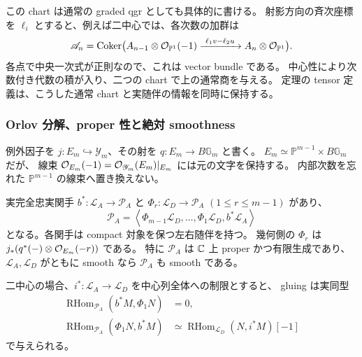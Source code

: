この chart は通常の graded qgr としても具体的に書ける。
射影方向の斉次座標を $\ell_i$ とすると、例えば二中心では、各次数の加群は
\[
 \mathscr A_n
   =\operatorname{Coker}\bigl(
    A_{n-1}\otimes\mathcal O_{\mathbb P^1}(-1)
       \xrightarrow{\ \ell_1v-\ell_2u\ }
    A_n\otimes\mathcal O_{\mathbb P^1}\bigr).
\]
各点で中央一次式が正則なので、これは vector bundle である。
中心性により次数付き代数の積が入り、二つの chart で上の通常商を与える。
定理の tensor 定義は、こうした通常 chart と実随伴の情報を同時に保持する。

\subsubsection{Orlov 分解、proper 性と絶対 smoothness}

例外因子を $j:E_m\hookrightarrow\mathscr Y_m$、その射を
$q:E_m\to B\mathbb G_m$ と書く。
$E_m\simeq\mathbb P^{m-1}\times B\mathbb G_m$ だが、
線束 $\mathcal O_{E_m}(-1)=\mathcal O_{\mathscr Y_m}(E_m)|_{E_m}$ には元の文字を保持する。
内部次数を忘れた $\mathbb P^{m-1}$ の線束へ置き換えない。

\begin{proposition}
\label{mbl:prop:orlov}
実完全忠実関手 $b^*:\mathcal L_A\to\mathcal P_A$ と
$\Phi_r:\mathcal L_D\to\mathcal P_A$ $(1\le r\le m-1)$ があり、
\begin{equation}\label{mbl:eq:orlov}
 \mathcal P_A
   =\left\langle
      \Phi_{m-1}\mathcal L_D,\ldots,\Phi_1\mathcal L_D,
      b^*\mathcal L_A
     \right\rangle
\end{equation}
となる。各関手は compact 対象を保つ左右随伴を持つ。
幾何側の $\Phi_r$ は $j_*(q^*(-)\otimes\mathcal O_{E_m}(-r))$ である。
特に $\mathcal P_A$ は $\mathbb C$ 上 proper かつ有限生成であり、
$\mathcal L_A,\mathcal L_D$ がともに smooth なら $\mathcal P_A$ も smooth である。

二中心の場合、$i^*:\mathcal L_A\to\mathcal L_D$ を中心列全体への制限とすると、
gluing は実同型
\begin{equation}\label{mbl:eq:gluing}
 \begin{split}
 \operatorname{RHom}_{\mathcal P_A}(b^*M,\Phi_1 N)&=0,\\
 \operatorname{RHom}_{\mathcal P_A}(\Phi_1 N,b^*M)
      &\simeq\operatorname{RHom}_{\mathcal L_D}(N,i^*M)[-1]
 \end{split}
\end{equation}
で与えられる。
\end{proposition}

